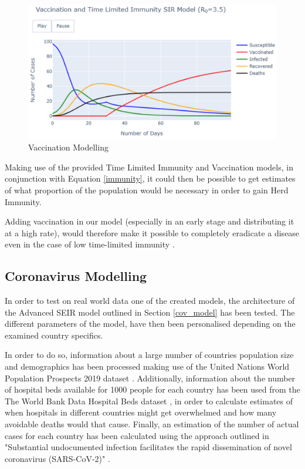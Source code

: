 \begin{figure}[ht!]%
    \centering
    \includegraphics[width=0.85\linewidth]{latex/images/vacc.pdf}
    \vspace{-0.2cm}
    \caption{Vaccination Modelling}
    \label{vacc}
\end{figure}
\vspace{-0.5cm}
Making use of the provided Time Limited Immunity and Vaccination models, in conjunction with Equation \ref{immunity}, it could then be possible to get estimates of what proportion of the population would be necessary in order to gain Herd Immunity. 

Adding vaccination in our model (especially in an early stage and distributing it at a high rate), would therefore make it possible to completely eradicate a disease even in the case of low time-limited immunity \cite{next}.

\subsection{Coronavirus Modelling}
In order to test on real world data one of the created models, the architecture of the Advanced SEIR model outlined in Section \ref{cov_model} has been tested. The different parameters of the model, have then been personalised depending on the examined country specifics.

In order to do so, information about a large number of countries population size and demographics has been processed making use of the United Nations World Population Prospects 2019 dataset \cite{pop_data}. Additionally, information about the number of hospital beds available for 1000 people for each country has been used from the The World Bank Data Hospital Beds dataset \cite{beds_data}, in order to calculate estimates of when hospitals in different countries might get overwhelmed and how many avoidable deaths would that cause. Finally, an estimation of the number of actual cases for each country has been calculated using the approach outlined in "Substantial undocumented infection facilitates the rapid dissemination of novel coronavirus (SARS-CoV-2)" \cite{cases_paper}.

